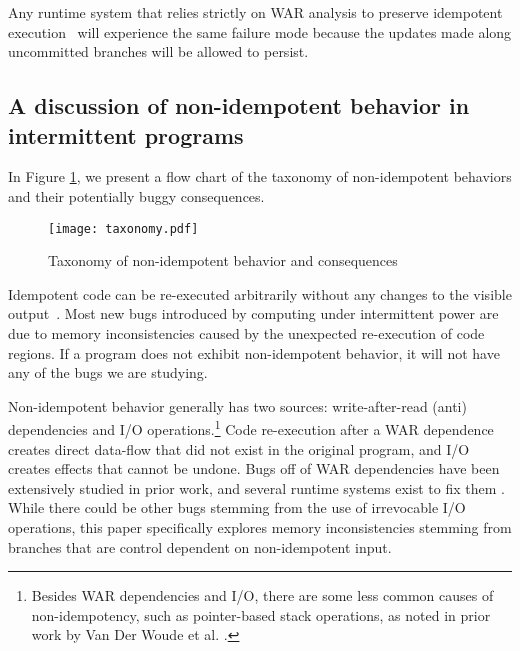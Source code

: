 Any runtime system that relies strictly on WAR analysis to preserve idempotent
execution~\cite{dino, alpaca, ratchet} will experience the same failure mode
because the updates made along uncommitted branches will be allowed to persist.


\subsection{A discussion of non-idempotent behavior in intermittent programs}

In Figure \ref{fig:tax}, we present a flow chart of the taxonomy of
non-idempotent behaviors and their potentially buggy consequences.

\begin{figure}[ht]
\centering
\texttt{[image: taxonomy.pdf]}
\caption{Taxonomy of non-idempotent behavior and consequences}
\label{fig:tax}
\end{figure}
Idempotent code can be re-executed arbitrarily without any changes to the
visible output~\cite{ratchet,dino}. Most new bugs introduced by computing under
intermittent power are due to memory inconsistencies caused by the unexpected
re-execution of code regions. If a program does not exhibit non-idempotent
behavior, it will not have any of the bugs we are studying.

Non-idempotent behavior generally has two sources: write-after-read (anti)
dependencies and I/O operations.\footnote{Besides WAR dependencies and I/O,
there are some less common causes of non-idempotency, such as pointer-based
stack operations, as noted in prior work by Van Der Woude et al.
\cite{ratchet}.} Code re-execution after a WAR dependence creates direct
data-flow that did not exist in the original program, and I/O creates effects
that cannot be undone. Bugs off of WAR dependencies have been extensively
studied in prior work, and several runtime systems exist to fix them
\cite{ratchet, alpaca, dino}. While there could be other bugs
stemming from the use of irrevocable I/O operations, this paper specifically
explores memory inconsistencies stemming from branches that are control
dependent on non-idempotent input.

